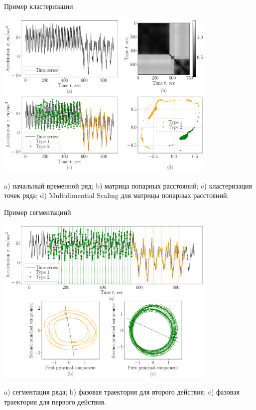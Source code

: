 \documentclass[9pt,pdf,hyperref={unicode}]{beamer}
\begin{document}
\begin{frame}{Пример кластеризации}
\justifying

\begin{center}
	\includegraphics[width=0.8\textwidth]{results/experiment_clustering}
\end{center}

a) начальный временной ряд; b) матрица попарных расстояний; c) кластеризация точек ряда; d) Multidimential Scaling для матрицы попарных расстояний.
\end{frame}
\begin{frame}{Пример сегментации}й
\justifying
\begin{center}
	\includegraphics[width=0.8\textwidth]{results/experiment_segmentation}
\end{center}
a) сегментация ряда; b) фазовая траектория для второго действия; c) фазовая траектория для первого действия.

\end{frame}
\end{document}
